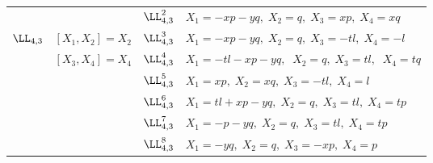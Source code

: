 \begin{table}
\begin{center}
\begin{tabular}{|l|l|l|l|}
\cline{3-4}
 &  & $\LL_{4,3}^2$ & $X_1=-xp-yq,\;X_2=q,\;
                                X_3=xp,\;X_4=xq$\\
\cline{3-4}
$\LL_{4,3}$ &$[X_1,X_2]=X_2$ & $\LL_{4,3}^3$ &  
$X_1=-xp-yq,\;X_2=q,\;X_3=-tl,\;X_4=-l$\\  
\cline{3-4} 
 & $[X_3,X_4]=X_4$ & $\LL_{4,3}^4$ & $X_1=-tl-xp-yq,\;\;X_2=q,\;
                                              X_3=tl,\;\; X_4=tq$\\
\cline{3-4}
&  & $\LL_{4,3}^5$ & $X_1=xp,\;X_2=xq,\;X_3=-tl,\;X_4=l$\\
\cline{3-4}
&  & $\LL_{4,3}^6$ & $X_1=tl+xp-yq,\;X_2=q,\;X_3=tl,\;X_4=tp$\\
\cline{3-4}
&  & $\LL_{4,3}^7$ & $X_1=-p-yq,\;X_2=q,\;X_3=tl,\;X_4=tp$\\
\cline{3-4}
& & $\LL_{4,3}^8$ & $X_1=-yq,\;X_2=q,\;X_3=-xp,\;X_4=p$\\
\hline
\end{tabular}
\end{center}
\end{table}
\setcounter{table}{1}

